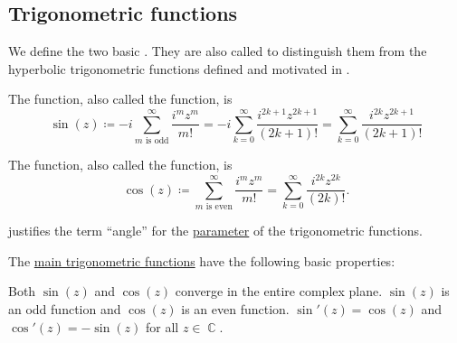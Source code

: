 \subsection{Trigonometric functions}\label{subsec:trigonometric_functions}

\begin{definition}\label{def:trigonometric_functions}
  We define the two basic . They are also called  to distinguish them from the hyperbolic trigonometric functions defined and motivated in .

  \begin{thmenum}
     The  function, also called the  function, is
    \begin{equation*}
      \sin(z)
      \coloneqq
      -i \sum_{m \text{ is odd}}^\infty \frac {i^m z^m} {m!}
      =
      -i \sum_{k=0}^\infty \frac {i^{2k+1} z^{2k+1}} {(2k + 1)!}
      =
      \sum_{k=0}^\infty \frac {i^{2k} z^{2k+1}} {(2k + 1)!}
    \end{equation*}

     The  function, also called the  function, is
    \begin{equation*}
      \cos(z)
      \coloneqq
      \sum_{m \text{ is even}}^\infty \frac {i^m z^m} {m!}
      =
      \sum_{k=0}^\infty \frac {i^{2k} z^{2k}} {(2k)!}.
    \end{equation*}
  \end{thmenum}

   justifies the term \enquote{angle} for the \hyperref[def:function/argument]{parameter} of the trigonometric functions.
\end{definition}
\begin{proposition}\label{thm:trigonometric_function_properties}
  The \hyperref[def:trigonometric_functions]{main trigonometric functions} have the following basic properties:
  \begin{thmenum}
     Both \( \sin(z) \) and \( \cos(z) \) converge in the entire complex plane.
     \( \sin(z) \) is an odd function and \( \cos(z) \) is an even function.
     \( \sin'(z) = \cos(z) \) and \( \cos'(z) = -\sin(z) \) for all \( z \in \BbbC \).
  \end{thmenum}
\end{proposition}
